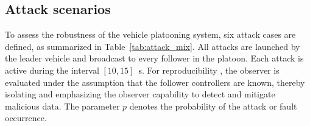 


\vspace*{-0.2cm}
\subsection{Attack scenarios}\label{sec:attack_scenarios}
\vspace*{-0.2cm}
To assess the robustness of the vehicle platooning system, six attack cases are defined, as summarized in Table~\ref{tab:attack_mix}. All attacks are launched by the leader vehicle and broadcast to every follower in the platoon. Each attack is active during the interval $[10, 15]$~s. For reproducibility
, the observer is evaluated under the assumption that the follower controllers are known, thereby isolating and emphasizing the observer capability to detect and mitigate malicious data. The parameter $p$ denotes the probability of the attack or fault occurrence.

